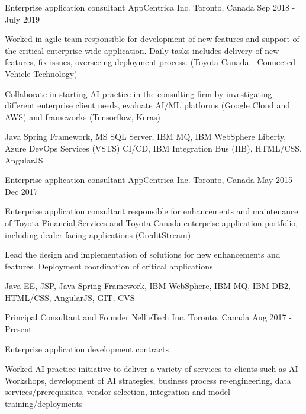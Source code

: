 \begin{cventries}


  \cventry
    {Enterprise application consultant}
    {AppCentrica Inc.}
    {Toronto, Canada}
    {Sep 2018 - July 2019}
    {
      \begin{cvitems}
      	\item{Worked in agile team responsible for development of new features and support of the critical enterprise wide application. Daily tasks includes delivery of new features, fix issues, overseeing deployment process.  (Toyota Canada - Connected Vehicle Technology)}
      	\item{Collaborate in starting AI practice in the consulting firm by investigating different enterprise client needs, evaluate AI/ML platforms (Google Cloud and AWS) and frameworks (Tensorflow, Keras) }
       \item {Java Spring Framework, MS SQL Server, IBM MQ, IBM WebSphere Liberty, Azure DevOps Services (VSTS) CI/CD, IBM Integration Bus (IIB), HTML/CSS, AngularJS}
      \end{cvitems}
    }
    


  \cventry
    {Enterprise application consultant}
    {AppCentrica Inc.}
    {Toronto, Canada}
    {May 2015 - Dec 2017}
    {
      \begin{cvitems}
      	\item{Enterprise application consultant responsible for enhancements and maintenance of Toyota Financial Services and Toyota Canada enterprise application portfolio, including dealer facing applications (CreditStream)}
        \item {Lead the design and implementation of solutions for new enhancements and features. Deployment coordination of critical applications}
        \item {Java EE, JSP, Java Spring Framework, IBM WebSphere, IBM MQ, IBM DB2, HTML/CSS, AngularJS, GIT, CVS  }
      \end{cvitems}
    }

  \cventry
    {Principal Consultant and Founder}
    {NellieTech Inc.}
    {Toronto, Canada}
    {Aug 2017 - Present}
    {
      \begin{cvitems}
        \item{Enterprise application development contracts}
        \item{Worked AI practice initiative to deliver a variety of services to clients such as AI Workshops, development of AI strategies, business process re-engineering, data services/prerequisites, vendor selection, integration and model training/deployments}
      \end{cvitems}
    }
    

\end{cventries}
